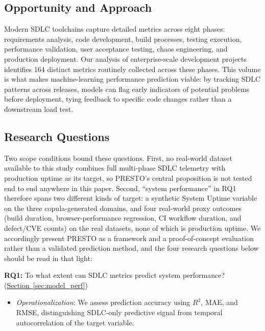 \documentclass[technologies,article,submit,pdftex,moreauthors]{Definitions/mdpi}
\providecommand{\tightlist}{%
  \setlength{\itemsep}{0pt}\setlength{\parskip}{0pt}}
\begin{document}
\subsection{Opportunity and Approach}\label{sec:opportunity}

Modern SDLC toolchains capture detailed metrics across eight phases: requirements analysis, code development, build processes, testing execution, performance validation, user acceptance testing, chaos engineering, and production deployment. Our analysis of enterprise-scale development projects identifies 164 distinct metrics routinely collected across these phases. This volume is what makes machine-learning performance prediction viable: by tracking SDLC patterns across releases, models can flag early indicators of potential problems before deployment, tying feedback to specific code changes rather than a downstream load test.

\subsection{Research Questions}\label{sec:research_questions}

Two scope conditions bound these questions. First, no real-world dataset available to this study combines full multi-phase SDLC telemetry with production uptime as its target, so PRESTO's central proposition is not tested end to end anywhere in this paper. Second, ``system performance'' in RQ1 therefore spans two different kinds of target: a synthetic System Uptime variable on the three copula-generated domains, and four real-world proxy outcomes (build duration, browser-performance regression, CI workflow duration, and defect/CVE counts) on the real datasets, none of which is production uptime. We accordingly present PRESTO as a framework and a proof-of-concept evaluation rather than a validated prediction method, and the four research questions below should be read in that light:

\textbf{RQ1:} To what extent can SDLC metrics predict system performance? (\hyperref[sec:model_perf]{Section~\ref*{sec:model_perf}})

\begin{itemize}
\tightlist
\item
  \emph{Operationalization}: We assess prediction accuracy using \(R^2\), MAE, and RMSE, distinguishing SDLC-only predictive signal from temporal autocorrelation of the target variable.
\end{itemize}
\end{document}

